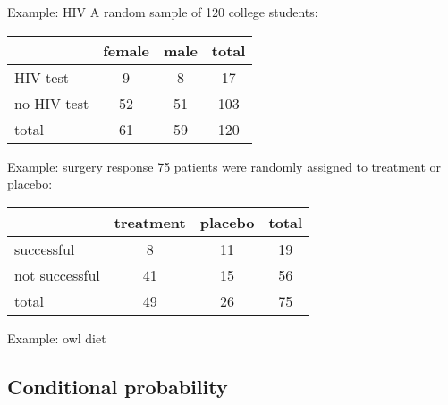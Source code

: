 \begin{frame}{Example: HIV}
    A random sample of 120 college students:
    \begin{center}
        \begin{tabular}{lcc|c}
            & female & male & total \\
            \hline
            HIV test & 9 & 8 & 17 \\
            no HIV test & 52 & 51 & 103 \\
            \hline
            total & 61 & 59 & 120 \\
        \end{tabular}
    \end{center}

    \vspace{2em}


\end{frame}

\begin{frame}{Example: surgery response}
    75 patients were randomly assigned to treatment or placebo:
    \begin{center}
        \begin{tabular}{lcc|c}
            & treatment & placebo & total\\
            \hline
            successful & 8 & 11 & 19 \\
            not successful & 41 & 15 & 56\\
            \hline
            total & 49 & 26 & 75 \\
        \end{tabular}
    \end{center}

    \vspace{2em}

\end{frame}

\begin{frame}{Example: owl diet}

    \begin{center}
    \end{center}

    \vspace{2em}


\end{frame}

\subsection{Conditional probability}



